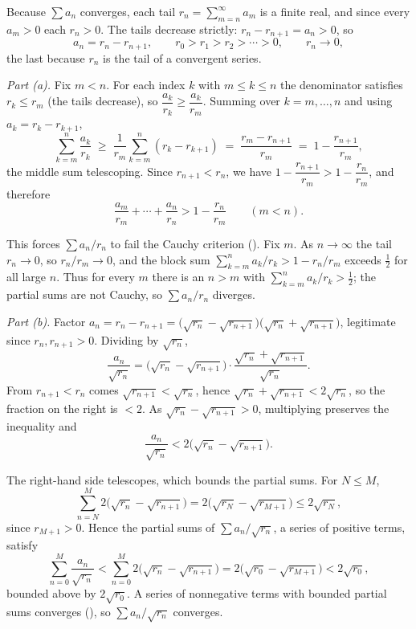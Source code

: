 \documentclass[main.tex]{subfiles}
\begin{document}
\begin{SolutionBlue}
Because $\sum a_n$ converges, each tail $r_n=\sum_{m=n}^{\infty}a_m$ is a finite real, and since every
$a_m>0$ each $r_n>0$. The tails decrease strictly: $r_n-r_{n+1}=a_n>0$, so
\[
a_n=r_n-r_{n+1},\qquad r_0>r_1>r_2>\cdots>0,\qquad r_n\to 0,
\]
the last because $r_n$ is the tail of a convergent series.

\emph{Part (a).} Fix $m<n$. For each index $k$ with $m\le k\le n$ the denominator satisfies
$r_k\le r_m$ (the tails decrease), so $\dfrac{a_k}{r_k}\ge\dfrac{a_k}{r_m}$. Summing over
$k=m,\dots,n$ and using $a_k=r_k-r_{k+1}$,
\[
\sum_{k=m}^{n}\frac{a_k}{r_k}\;\ge\;\frac{1}{r_m}\sum_{k=m}^{n}(r_k-r_{k+1})
      \;=\;\frac{r_m-r_{n+1}}{r_m}\;=\;1-\frac{r_{n+1}}{r_m},
\]
the middle sum telescoping. Since $r_{n+1}<r_n$, we have $1-\dfrac{r_{n+1}}{r_m}>1-\dfrac{r_n}{r_m}$,
and therefore
\[
\frac{a_m}{r_m}+\cdots+\frac{a_n}{r_n}>1-\frac{r_n}{r_m}\qquad(m<n).
\]

This forces $\sum a_n/r_n$ to fail the Cauchy criterion (). Fix $m$. As $n\to\infty$ the
tail $r_n\to 0$, so $r_n/r_m\to 0$, and the block sum $\sum_{k=m}^{n}a_k/r_k>1-r_n/r_m$ exceeds
$\tfrac12$ for all large $n$. Thus for every $m$ there is an $n>m$ with
$\sum_{k=m}^{n}a_k/r_k>\tfrac12$; the partial sums are not Cauchy, so $\sum a_n/r_n$ diverges.

\emph{Part (b).} Factor $a_n=r_n-r_{n+1}=\bigl(\sqrt{r_n}-\sqrt{r_{n+1}}\bigr)\bigl(\sqrt{r_n}+\sqrt{r_{n+1}}\bigr)$,
legitimate since $r_n,r_{n+1}>0$. Dividing by $\sqrt{r_n}$,
\[
\frac{a_n}{\sqrt{r_n}}
   =\bigl(\sqrt{r_n}-\sqrt{r_{n+1}}\bigr)\cdot\frac{\sqrt{r_n}+\sqrt{r_{n+1}}}{\sqrt{r_n}} .
\]
From $r_{n+1}<r_n$ comes $\sqrt{r_{n+1}}<\sqrt{r_n}$, hence
$\sqrt{r_n}+\sqrt{r_{n+1}}<2\sqrt{r_n}$, so the fraction on the right is $<2$. As
$\sqrt{r_n}-\sqrt{r_{n+1}}>0$, multiplying preserves the inequality and
\[
\frac{a_n}{\sqrt{r_n}}<2\bigl(\sqrt{r_n}-\sqrt{r_{n+1}}\bigr).
\]

The right-hand side telescopes, which bounds the partial sums. For $N\le M$,
\[
\sum_{n=N}^{M}2\bigl(\sqrt{r_n}-\sqrt{r_{n+1}}\bigr)=2\bigl(\sqrt{r_N}-\sqrt{r_{M+1}}\bigr)\le 2\sqrt{r_N},
\]
since $r_{M+1}>0$. Hence the partial sums of $\sum a_n/\sqrt{r_n}$, a series of positive terms, satisfy
\[
\sum_{n=0}^{M}\frac{a_n}{\sqrt{r_n}}<\sum_{n=0}^{M}2\bigl(\sqrt{r_n}-\sqrt{r_{n+1}}\bigr)
   =2\bigl(\sqrt{r_0}-\sqrt{r_{M+1}}\bigr)<2\sqrt{r_0},
\]
bounded above by $2\sqrt{r_0}$. A series of nonnegative terms with bounded partial sums converges
(), so $\sum a_n/\sqrt{r_n}$ converges.
\end{SolutionBlue}
\end{document}
